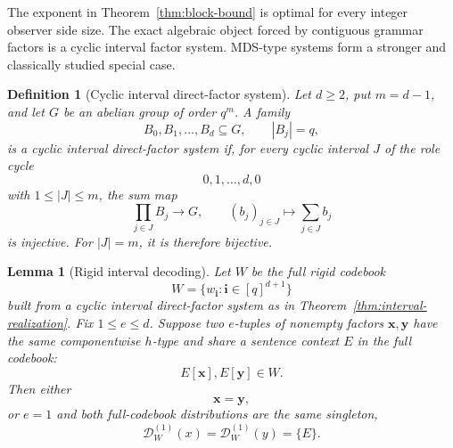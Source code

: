 \documentclass[11pt]{article}
\newtheorem{lemma}[theorem]{Lemma}
\newtheorem{definition}[theorem]{Definition}
\newcommand{\D}{\mathcal D}
\begin{document}
The exponent in Theorem~\ref{thm:block-bound} is optimal for every integer
observer side size.  The exact algebraic object forced by contiguous grammar
factors is a cyclic interval factor system.  MDS-type systems form a stronger
and classically studied special case.

\begin{definition}[Cyclic interval direct-factor system]
\label{def:interval-factor}
Let \(d\ge2\), put \(m=d-1\), and let \(G\) be an abelian group of
order \(q^m\). A family
\[
 B_0,B_1,\ldots,B_d\subseteq G,\qquad |B_j|=q,
\]
is a \emph{cyclic interval direct-factor system} if, for every cyclic
interval \(J\) of the role cycle
\[
 0,1,\ldots,d,0
\]
with \(1\le |J|\le m\), the sum map
\[
 \prod_{j\in J}B_j\longrightarrow G,\qquad
 (b_j)_{j\in J}\longmapsto\sum_{j\in J}b_j
\]
is injective. For \(|J|=m\), it is therefore bijective.
\end{definition}

\begin{lemma}[Rigid interval decoding]
\label{lem:interval-rigid-decoding}
Let \(W\) be the full rigid codebook
\[
 W=\{w_{\mathbf i}:\mathbf i\in[q]^{d+1}\}
\]
built from a cyclic interval direct-factor system as in
Theorem~\ref{thm:interval-realization}.  Fix \(1\le e\le d\).
Suppose two \(e\)-tuples of nonempty factors \(\mathbf x,\mathbf y\)
have the same componentwise \(h\)-type and share a sentence context
\(E\) in the full codebook:
\[
 E[\mathbf x],E[\mathbf y]\in W.
\]
Then either
\[
 \mathbf x=\mathbf y,
\]
or \(e=1\) and both full-codebook distributions are the same singleton,
\[
 \D_W^{(1)}(x)=\D_W^{(1)}(y)=\{E\}.
\]
\end{lemma}
\end{document}
